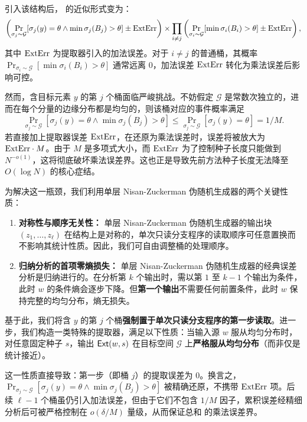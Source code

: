 引入该结构后， 的近似形式变为：
\begin{align*}
    \left( \Pr_{\sigma_j \sim \mathcal{G}}[\sigma_j(y) = \theta \wedge \min \sigma_j(B_j) > \theta] \pm \mathrm{ExtErr} \right) \times \prod_{i \ne j} \left( \Pr_{\sigma_i \sim \mathcal{G}}[\min \sigma_i(B_i) > \theta] \pm \mathrm{ExtErr} \right),
\end{align*}
其中 $\mathrm{ExtErr}$ 为提取器引入的加法误差。对于 $i \ne j$ 的普通桶，其概率 $\Pr_{\sigma_i \sim \mathcal{G}}[\min \sigma_i(B_i) > \theta]$ 通常远离 $0$，加法误差 $\mathrm{ExtErr}$ 转化为乘法误差后影响可控。

然而，含目标元素 $y$ 的第 $j$ 个桶面临严峻挑战。不妨假定 $\mathcal{G}$ 是常数次独立的，进而在每个分量的边缘分布都是均匀的，则该桶对应的事件概率满足
$$
\Pr_{\sigma_j \sim \mathcal{G}}[\sigma_j(y) = \theta \wedge \min \sigma_j(B_j) > \theta] \le \Pr_{\sigma_j \sim \mathcal{G}}[\sigma_j(y) = \theta] = 1 / M.
$$
若直接加上提取器误差 $\mathrm{ExtErr}$，在还原为乘法误差时，误差将被放大为 $\mathrm{ExtErr} \cdot M$。由于 $M$ 是多项式大小，而 $\mathrm{ExtErr}$ 为了控制种子长度只能做到 $N^{-o(1)}$，这将彻底破坏乘法误差界。这也正是导致先前方法种子长度无法降至 $O(\log N)$ 的核心症结。

为解决这一瓶颈，我们利用单层 Nisan-Zuckerman 伪随机生成器的两个关键性质：
\begin{enumerate}
    \item \textbf{对称性与顺序无关性：} 单层 Nisan-Zuckerman 伪随机生成器的输出块 $(z_1, \ldots, z_\ell)$ 在结构上是对称的，单次只读分支程序的读取顺序可任意置换而不影响其统计性质。因此，我们可自由调整桶的处理顺序。
    \item \textbf{归纳分析的首项零熵损失：} 单层 Nisan-Zuckerman 伪随机生成器的经典误差分析是归纳进行的。在分析第 $k$ 个输出时，需以第 $1$ 至 $k - 1$ 个输出为条件，此时 $w$ 的条件熵会逐步下降。但\textbf{第一个输出}不需要任何前置条件，此时 $w$ 保持完整的均匀分布，熵无损失。
\end{enumerate}
基于此，我们将含 $y$ 的第 $j$ 个桶\textbf{强制置于单次只读分支程序的第一步读取}。进一步，我们构造一类特殊的提取器，满足以下性质：当输入源 $w$ 服从均匀分布时，对任意固定种子 $s$，输出 $\mathsf{Ext}(w, s)$ 在目标空间 $\mathcal{G}$ 上\textbf{严格服从均匀分布}（而非仅是统计接近）。

这一性质直接导致：第一步（即桶 $j$）的提取误差为 $0$。换言之，$\Pr_{\sigma_j \sim \mathcal{G}}[\sigma_j(y) = \theta \wedge \min \sigma_j(B_j) > \theta]$ 被精确还原，不携带 $\mathrm{ExtErr}$ 项。后续 $\ell-1$ 个桶虽仍引入加法误差，但由于它们不包含 $1/M$ 因子，累积误差经精细分析后可被严格控制在 $o(\delta/M)$ 量级，从而保证总和  的乘法误差界。

